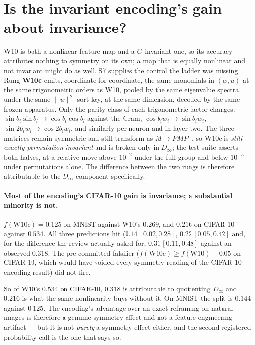 \documentclass[10pt,twocolumn,letterpaper]{article}
\theoremstyle{definition}
\newcommand{\Dinf}{D_\infty}
\begin{document}
\section{Is the invariant encoding's gain about invariance?}\label{sec:control}

W10 is both a nonlinear feature map and a $G$-invariant one, so its accuracy attributes nothing to
symmetry on its own; a map that is equally nonlinear and not invariant might do as well. S7 supplies
the control the ladder was missing. Rung \textbf{W10c} emits, coordinate for coordinate, the same
monomials in $(w,u)$ at the same trigonometric orders as W10, pooled by the same eigenvalue spectra
under the same $\|w\|^2$ sort key, at the same dimension, decoded by the same frozen apparatus. Only
the parity class of each trigonometric factor changes: $\sin b_i \sin b_l \to \cos b_i \cos b_l$
against the Gram, $\cos b_i w_i \to \sin b_i w_i$, $\sin 2b_i w_i \to \cos 2b_i w_i$, and similarly
per neuron and in layer two. The three matrices remain symmetric and still transform as
$M \mapsto PMP^\top$, so W10c is \emph{still exactly permutation-invariant} and is broken only in
$\Dinf$; the test suite asserts both halves, at a relative move above $10^{-2}$ under the full group
and below $10^{-5}$ under permutations alone. The difference between the two rungs is therefore
attributable to the $\Dinf$ component specifically.



\paragraph{Most of the encoding's CIFAR-10 gain is invariance; a substantial minority is not.}
$f(\mathrm{W10c}) = 0.125$ on MNIST against W10's $0.269$, and $0.216$ on CIFAR-10 against
$0.534$. All three predictions hit ($0.14\,[0.02,0.28]$, $0.22\,[0.05,0.42]$ and, for
the difference the review actually asked for, $0.31\,[0.11,0.48]$ against an observed $0.318$. The
pre-committed falsifier ($f(\mathrm{W10c}) \ge f(\mathrm{W10}) - 0.05$ on CIFAR-10, which would
have voided every symmetry reading of the CIFAR-10 encoding result) did not fire.

So of W10's $0.534$ on CIFAR-10, $0.318$ is attributable to quotienting $\Dinf$ and $0.216$ is
what the same nonlinearity buys without it. On MNIST the split is $0.144$ against $0.125$. The
encoding's advantage over an exact reframing on natural images is therefore a genuine symmetry
effect and not a feature-engineering artifact --- but it is not \emph{purely} a symmetry effect
either, and the second registered probability call is the one that says so.
\end{document}
